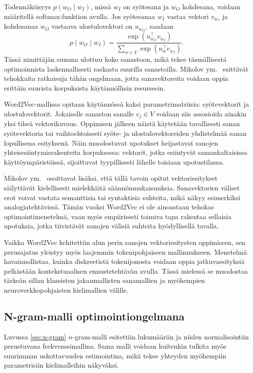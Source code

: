 Todennäköisyys \(p(w_O \mid w_I)\), missä \(w_I\) on syötesana ja \(w_O\)
kohdesana, voidaan määritellä softmax-funktion avulla. Jos syötesanaa \(w_I\)
vastaa vektori \(v_{w_I}\) ja kohdesanaa \(w_O\) vastaava ulostulovektori on
\(u_{w_O}\), saadaan
\[
  p(w_O \mid w_I)
  =
  \frac{\exp(u_{w_O}^{\top} v_{w_I})}
  {\sum_{w \in V} \exp(u_w^{\top} v_{w_I})}.
\]
Tässä nimittäjän summa ulottuu koko sanastoon, mikä tekee täsmällisestä
optimoinnista laskennallisesti raskasta suurilla sanastoilla. Mikolov ym.\
\cite{mikolov2013efficient} esittävät tehokkaita ratkaisuja tähän ongelmaan,
jotta sanavektoreita voidaan oppia erittäin suurista korpuksista käytännöllisin
resurssein.

Word2Vec-mallissa opitaan käytännössä kaksi parametrimatriisia: syötevektorit ja
ulostulovektorit. Jokaiselle sanaston sanalle \(v_j \in V\) voidaan siis
assosioida ainakin yksi tiheä vektorikuvaus. Oppimisen jälkeen näistä käytetään
tavallisesti sanan syötevektoria tai vaihtoehtoisesti syöte- ja
ulostulovektoreiden yhdistelmää sanan lopullisena esityksenä. Näin muodostuvat
upotukset heijastavat sanojen yhteisesiintymisrakenteita korpuksessa: vektorit,
jotka esiintyvät samankaltaisissa käyttöympäristöissä, sijoittuvat tyypillisesti
lähelle toisiaan upotustilassa.

Mikolov ym.\ \cite{mikolov2013efficient} osoittavat lisäksi, että tällä tavoin
opitut vektoriesitykset säilyttävät kielellisesti mielekkäitä
säännönmukaisuuksia. Sanavektorien väliset erot voivat vastata semanttisia tai
syntaktisia suhteita, mikä näkyy esimerkiksi analogiatehtävissä. Tämän vuoksi
Word2Vec ei ole ainoastaan tehokas optimointimenetelmä, vaan myös empiirisesti
toimiva tapa rakentaa sellaisia upotuksia, jotka tiivistävät sanojen välisiä
suhteita hyödyllisellä tavalla.

Vaikka Word2Vec kehitettiin alun perin sanojen vektoriesitysten oppimiseen, sen
perusajatus yleistyy myös laajemmin tokenipohjaiseen mallinnukseen. Menetelmä
havainnollistaa, kuinka diskreetistä tokenijonosta voidaan oppia
jatkuvaesityksiä pelkästään kontekstuaalisen ennustetehtävän avulla. Tässä
mielessä se muodostaa tärkeän sillan klassisten jakaumallisten sanamallien ja
myöhempien neuroverkkopohjaisten kielimallien välille.

\subsection{N-gram-malli optimointiongelmana}

Luvussa \ref{sec:n-gram} \(n\)-gram-malli esitettiin lukumääriin ja niiden
normalisointiin perustuvana frekvenssimallina. Sama malli voidaan kuitenkin
tulkita myös suurimman uskottavuuden estimointina, mikä tekee yhteyden
myöhempiin parametrisiin kielimalleihin näkyväksi.

